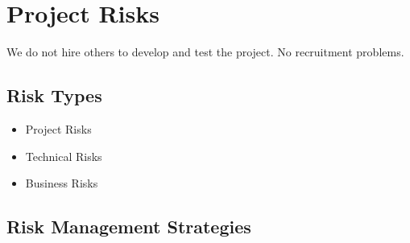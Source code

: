 \section{Project Risks}
We do not hire others to develop and test the project.
No recruitment problems.
%
\subsection{Risk Types}
\begin{itemize}
	\item Project Risks
	\item Technical Risks
	\item Business Risks
	\begin{itemize}
	\end{itemize}
\end{itemize}
%
\subsection{Risk Management Strategies}


